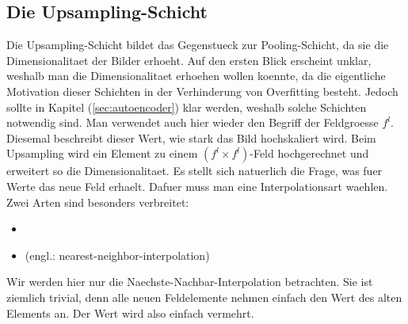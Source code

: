 \cite{deeplearning.ai:cnn}
\cite{Goodfellow-et-al-2016}

\subsection{Die Upsampling-Schicht}
Die Upsampling-Schicht bildet das Gegenstueck zur Pooling-Schicht, da sie die
Dimensionalitaet der Bilder erhoeht. Auf den ersten Blick erscheint unklar,
weshalb man die Dimensionalitaet erhoehen wollen koennte, da die eigentliche
Motivation dieser Schichten in der Verhinderung von Overfitting besteht. Jedoch
sollte in Kapitel (\ref{sec:autoencoder}) klar werden, weshalb solche Schichten
notwendig sind.
\para{}
Man verwendet auch hier wieder den Begriff der Feldgroesse $f^l$. Diesemal
beschreibt dieser Wert, wie stark das Bild hochskaliert wird. Beim Upsampling
wird ein Element zu einem $(f^l \times f^l)$-Feld hochgerechnet und erweitert so die
Dimensionalitaet.
\para{}
Es stellt sich natuerlich die Frage, was fuer Werte das neue Feld erhaelt.
Dafuer muss man eine Interpolationsart waehlen.
Zwei Arten sind besonders verbreitet:
\begin{itemize}
\item{}
\item{ (engl.: nearest-neighbor-interpolation)}
\end{itemize}
Wir werden hier nur die Naechste-Nachbar-Interpolation betrachten. Sie ist
ziemlich trivial, denn alle neuen Feldelemente nehmen einfach den Wert des alten
Elements an. Der Wert wird also einfach vermehrt.


\cite{deeplearning.ai:cnn}
\cite{Goodfellow-et-al-2016}

\pagebreak
